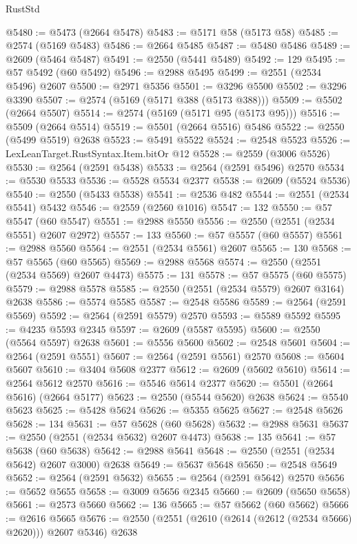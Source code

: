 \begin{lexlean}{RustStd}
\begin{coremodule}
@5480 := @5473 (@2664 @5478)
@5483 := @5171 @58 (@5173 @58)
@5485 := @2574 (@5169 @5483)
@5486 := @2664 @5485
@5487 := @5480 @5486
@5489 := @2609 (@5464 @5487)
@5491 := @2550 (@5441 @5489)
@5492 := 129
@5495 := @57 @5492 (@60 @5492)
@5496 := @2988 @5495
@5499 := @2551 (@2534 @5496) @2607
@5500 := @2971 @5356
@5501 := @3296 @5500
@5502 := @3296 @3390
@5507 := @2574 (@5169 (@5171 @388 (@5173 @388)))
@5509 := @5502 (@2664 @5507)
@5514 := @2574 (@5169 (@5171 @95 (@5173 @95)))
@5516 := @5509 (@2664 @5514)
@5519 := @5501 (@2664 @5516) @5486
@5522 := @2550 (@5499 @5519) @2638
@5523 := @5491 @5522
@5524 := @2548 @5523
@5526 := LexLeanTarget.RustSyntax.Item.bitOr @12
@5528 := @2559 (@3006 @5526)
@5530 := @2564 (@2591 @5438)
@5533 := @2564 (@2591 @5496) @2570
@5534 := @5530 @5533
@5536 := @5528 @5534 @2377
@5538 := @2609 (@5524 @5536)
@5540 := @2550 (@5433 @5538)
@5541 := @2536 @482
@5544 := @2551 (@2534 @5541) @5432
@5546 := @2559 (@2560 @1016)
@5547 := 132
@5550 := @57 @5547 (@60 @5547)
@5551 := @2988 @5550
@5556 := @2550 (@2551 (@2534 @5551) @2607 @2972)
@5557 := 133
@5560 := @57 @5557 (@60 @5557)
@5561 := @2988 @5560
@5564 := @2551 (@2534 @5561) @2607
@5565 := 130
@5568 := @57 @5565 (@60 @5565)
@5569 := @2988 @5568
@5574 := @2550 (@2551 (@2534 @5569) @2607 @4473)
@5575 := 131
@5578 := @57 @5575 (@60 @5575)
@5579 := @2988 @5578
@5585 := @2550 (@2551 (@2534 @5579) @2607 @3164) @2638
@5586 := @5574 @5585
@5587 := @2548 @5586
@5589 := @2564 (@2591 @5569)
@5592 := @2564 (@2591 @5579) @2570
@5593 := @5589 @5592
@5595 := @4235 @5593 @2345
@5597 := @2609 (@5587 @5595)
@5600 := @2550 (@5564 @5597) @2638
@5601 := @5556 @5600
@5602 := @2548 @5601
@5604 := @2564 (@2591 @5551)
@5607 := @2564 (@2591 @5561) @2570
@5608 := @5604 @5607
@5610 := @3404 @5608 @2377
@5612 := @2609 (@5602 @5610)
@5614 := @2564 @5612 @2570
@5616 := @5546 @5614 @2377
@5620 := @5501 (@2664 @5616) (@2664 @5177)
@5623 := @2550 (@5544 @5620) @2638
@5624 := @5540 @5623
@5625 := @5428 @5624
@5626 := @5355 @5625
@5627 := @2548 @5626
@5628 := 134
@5631 := @57 @5628 (@60 @5628)
@5632 := @2988 @5631
@5637 := @2550 (@2551 (@2534 @5632) @2607 @4473)
@5638 := 135
@5641 := @57 @5638 (@60 @5638)
@5642 := @2988 @5641
@5648 := @2550 (@2551 (@2534 @5642) @2607 @3000) @2638
@5649 := @5637 @5648
@5650 := @2548 @5649
@5652 := @2564 (@2591 @5632)
@5655 := @2564 (@2591 @5642) @2570
@5656 := @5652 @5655
@5658 := @3009 @5656 @2345
@5660 := @2609 (@5650 @5658)
@5661 := @2573 @5660
@5662 := 136
@5665 := @57 @5662 (@60 @5662)
@5666 := @2616 @5665
@5676 := @2550 (@2551 (@2610 (@2614 (@2612 (@2534 @5666) @2620))) @2607 @5346) @2638

\end{coremodule}
\end{lexlean}
